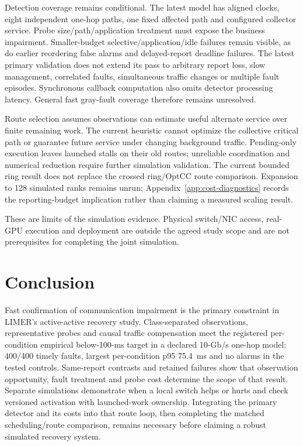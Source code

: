 \documentclass[sigconf]{acmart}
\begin{document}
Detection coverage remains conditional. The latest model has aligned clocks,
eight independent one-hop paths, one fixed affected path and configured
collector service. Probe size/path/application treatment must expose the
business impairment. Smaller-budget selective/application/idle failures
remain visible, as do earlier reordering false alarms and delayed-report
deadline failures. The latest primary validation does not extend its pass
to arbitrary report loss, slow management, correlated faults, simultaneous
traffic changes or multiple fault episodes. Synchronous callback computation
also omits detector processing latency. General fast gray-fault coverage
therefore remains unresolved.

Route selection assumes observations can estimate useful alternate service
over finite remaining work. The current heuristic cannot optimize the
collective critical path or guarantee future service under changing
background traffic. Pending-only execution leaves launched stalls on their
old routes; unreliable coordination and numerical reduction require further
simulation validation. The current bounded ring result does not replace the
crossed ring/OptCC route comparison. Expansion to 128 simulated ranks remains
unrun; Appendix~\ref{app:cost-diagnostics} records the reporting-budget
implication rather than claiming a measured scaling result.

These are limits of the simulation evidence. Physical switch/NIC access,
real-GPU execution and deployment are outside the agreed study scope and
are not prerequisites for completing the joint simulation.

\section{Conclusion}
Fast confirmation of communication impairment is the primary constraint in
LIMER's active-active recovery study. Class-separated observations,
representative probes and causal traffic compensation meet the registered
per-condition empirical below-100-ms target in a declared 10-Gb/s one-hop
model: 400/400 timely faults, largest per-condition p95 75.4~ms and no
alarms in the tested controls. Same-report contrasts and retained failures
show that observation opportunity, fault treatment and probe cost determine
the scope of that result. Separate simulations demonstrate when a local
switch helps or hurts and check versioned activation with launched-work
ownership. Integrating the primary detector and its costs into that route
loop, then completing the matched scheduling/route comparison, remains
necessary before claiming a robust simulated recovery system.
\end{document}
